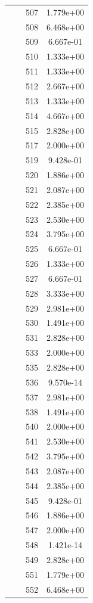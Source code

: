 \documentclass[12pt]{article}
\begin{document}
\begin{longtable}{@{}cccc@{}}
 &  & 507 & 1.779e+00 \\
 &  & 508 & 6.468e+00 \\
 &  & 509 & 6.667e-01 \\
 &  & 510 & 1.333e+00 \\
 &  & 511 & 1.333e+00 \\
 &  & 512 & 2.667e+00 \\
 &  & 513 & 1.333e+00 \\
 &  & 514 & 4.667e+00 \\
 &  & 515 & 2.828e+00 \\
 &  & 517 & 2.000e+00 \\
 &  & 519 & 9.428e-01 \\
 &  & 520 & 1.886e+00 \\
 &  & 521 & 2.087e+00 \\
 &  & 522 & 2.385e+00 \\
 &  & 523 & 2.530e+00 \\
 &  & 524 & 3.795e+00 \\
 &  & 525 & 6.667e-01 \\
 &  & 526 & 1.333e+00 \\
 &  & 527 & 6.667e-01 \\
 &  & 528 & 3.333e+00 \\
 &  & 529 & 2.981e+00 \\
 &  & 530 & 1.491e+00 \\
 &  & 531 & 2.828e+00 \\
 &  & 533 & 2.000e+00 \\
 &  & 535 & 2.828e+00 \\
 &  & 536 & 9.570e-14 \\
 &  & 537 & 2.981e+00 \\
 &  & 538 & 1.491e+00 \\
 &  & 540 & 2.000e+00 \\
 &  & 541 & 2.530e+00 \\
 &  & 542 & 3.795e+00 \\
 &  & 543 & 2.087e+00 \\
 &  & 544 & 2.385e+00 \\
 &  & 545 & 9.428e-01 \\
 &  & 546 & 1.886e+00 \\
 &  & 547 & 2.000e+00 \\
 &  & 548 & 1.421e-14 \\
 &  & 549 & 2.828e+00 \\
 &  & 551 & 1.779e+00 \\
 &  & 552 & 6.468e+00 \\

\end{longtable}
\end{document}

